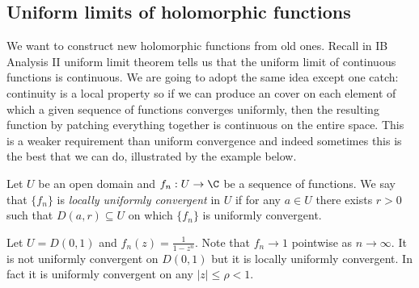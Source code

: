 \documentclass[a4paper]{article}
\begin{document}
\subsection{Uniform limits of holomorphic functions}

We want to construct new holomorphic functions from old ones. Recall in IB Analysis II uniform limit theorem tells us that the uniform limit of continuous functions is continuous. We are going to adopt the same idea except one catch: continuity is a local property so if we can produce an cover on each element of which a given sequence of functions converges uniformly, then the resulting function by patching everything together is continuous on the entire space. This is a weaker requirement than uniform convergence and indeed sometimes this is the best that we can do, illustrated by the example below.

\begin{definition}
  Let \(U\) be an open domain and \(f_n: U \to \C\) be a sequence of functions. We say that \(\{f_n\}\) is \emph{locally uniformly convergent} in \(U\) if for any \(a \in U\) there exists \(r > 0\) such that \(D(a, r) \subseteq U\) on which \(\{f_n\}\) is uniformly convergent.
\end{definition}

\begin{eg}
  Let \(U = D(0, 1)\) and \(f_n(z) = \frac{1}{1 - z^n}\). Note that \(f_n \to 1\) pointwise as \(n \to \infty\). It is not uniformly convergent on \(D(0, 1)\) but it is locally uniformly convergent. In fact it is uniformly convergent on any \(|z| \leq \rho < 1\).
\end{eg}




\printindex

\iffalse
past lecture notes:
T. Scholl, K. Carne

Book
Ahlfors, Complex Analysis
\fi
\end{document}
